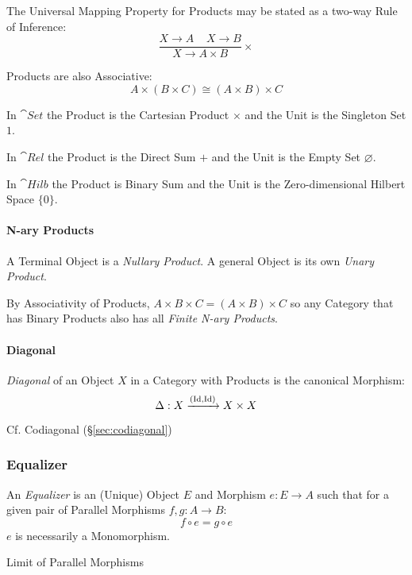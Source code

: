 The Universal Mapping Property for Products may be stated as a two-way
Rule of Inference:
\[
  {
    \frac{X \rightarrow A \;\;\;\; X \rightarrow B}
    {X \rightarrow A \times B}
  }\times
\]

Products are also Associative:
\[
  A \times (B \times C) \cong (A \times B) \times C
\]

In $\cat{Set}$ the Product is the Cartesian Product $\times$ and the
Unit is the Singleton Set $1$.

In $\cat{Rel}$ the Product is the Direct Sum $+$ and the Unit is
the Empty Set $\varnothing$.

In $\cat{Hilb}$ the Product is Binary Sum and the Unit is the
Zero-dimensional Hilbert Space $\{ 0 \}$. %



\paragraph{N-ary Products}\label{sec:category_nary}\hfill
A Terminal Object is a \emph{Nullary Product}. A general Object is its
own \emph{Unary Product}.

By Associativity of Products, $A \times B \times C = (A \times B)
\times C$ so any Category that has Binary Products also has all
\emph{Finite N-ary Products}.



\paragraph{Diagonal}\label{sec:diagonal}\hfill

\emph{Diagonal} of an Object $X$ in a Category with Products is the
canonical Morphism:
\[
  \Delta : X \xrightarrow{(\mathrm{Id},\mathrm{Id})} X \times X
\]

\fist Cf. Codiagonal (\S\ref{sec:codiagonal})



\subsubsection{Equalizer}\label{sec:equalizer}

An \emph{Equalizer} is an (Unique) Object $E$ and Morphism $e: E
\rightarrow A$ such that for a given pair of Parallel Morphisms $f,g :
A \rightarrow B$:
\[
  f \circ e = g \circ e
\]
$e$ is necessarily a Monomorphism.

Limit of Parallel Morphisms

